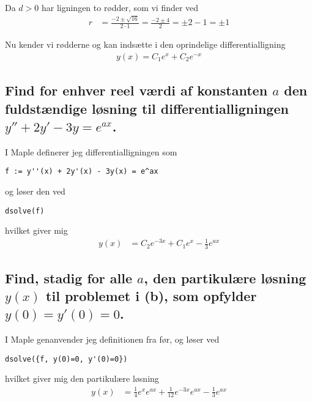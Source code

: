 \documentclass[11pt,a4paper]{article}
\begin{document}
Da $d > 0$ har ligningen to rødder, som vi finder ved
\begin{align}
    r &= \frac{-2 \pm \sqrt{16}}{2 \cdot 1} = \frac{-2 \pm 4}{2} = \pm 2 - 1 = \pm 1
\end{align}

Nu kender vi rødderne og kan indsætte i den oprindelige differentialligning
\begin{align}
    y(x) = C_1 e^{x} + C_2 e^{-x}
\end{align}

\subsection
{
    \mdseries
    Find for enhver reel værdi af konstanten $a$ den fuldstændige løsning til
    differentialligningen $y'' + 2y' - 3y = e^{ax}$.
}
I Maple definerer jeg differentialligningen som
\begin{lstlisting}
f := y''(x) + 2y'(x) - 3y(x) = e^ax
\end{lstlisting}
og løser den ved
\begin{lstlisting}
dsolve(f)
\end{lstlisting}
hvilket giver mig
\begin{align}
    y(x) &= C_2 e^{-3x} + C_1 e^x - \frac{1}{3}e^{ax}
\end{align}

\subsection
{
    \mdseries
    Find, stadig for alle $a$, den partikulære løsning $y(x)$ til problemet
    i (b), som opfylder $y(0) = y'(0) = 0$.
}
I Maple genanvender jeg definitionen fra før, og løser ved
\begin{lstlisting}
dsolve({f, y(0)=0, y'(0)=0})
\end{lstlisting}
hvilket giver mig den partikulære løsning
\begin{align}
    y(x) &= \frac{1}{4} e^x e^{ax}
          + \frac{1}{12} e^{-3x} e^{ax}
          - \frac{1}{3} e^{ax}
\end{align}
\end{document}
